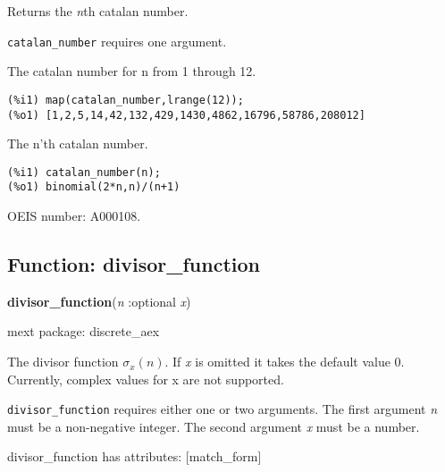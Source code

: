 \documentclass[]{article}
\begin{document}
\vspace{5 pt}
Returns the {\it n}th catalan number. 

\vspace{5 pt}

   {\tt catalan\_number} requires one argument.


\vspace{5 pt}


   The catalan number for n from 1 through 12. 

\begin{Verbatim}[frame=single]
(%i1) map(catalan_number,lrange(12));
(%o1) [1,2,5,14,42,132,429,1430,4862,16796,58786,208012]
\end{Verbatim}

   The n'th catalan number. 

\begin{Verbatim}[frame=single]
(%i1) catalan_number(n);
(%o1) binomial(2*n,n)/(n+1)
\end{Verbatim}


OEIS number: A000108.


\subsection{Function: divisor\_function\label{sec:divisor_function}}
\hypertarget{divisor_function}{}
{\bf divisor\_function}({\it n} :optional {\it x})


\noindent mext package: discrete\_aex



\vspace{5 pt}
The divisor function $\sigma_x(n)$. If {\it x} is omitted it takes the default value $0$. Currently, complex values for x are not supported. 

\vspace{5 pt}

   {\tt divisor\_function} requires either one or two arguments.
    The first argument {\it n} must be a non-negative integer.
    The second argument {\it x} must be a number.


\vspace{5 pt}

divisor\_function has attributes: [match\_form]

\vspace{5 pt}
\end{document}
